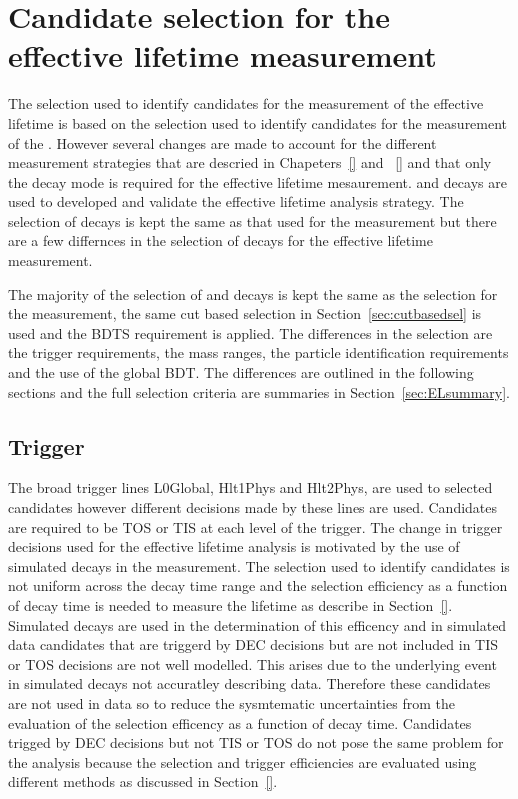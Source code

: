 \section{Candidate selection for the effective lifetime measurement}
\label{sec:ELsel}
The selection used to identify candidates for the measurement of the \bsmumu effective lifetime is based on the selection used to identify candidates for the measurement of the \bmumu \BFs. However several changes are made to account for the different measurement strategies that are descried in Chapeters~\ref{} and ~\ref{} and that only the \bs decay mode is required for the effective lifetime mesaurement. 
\bhh and \bsjpisphi decays are used to developed and validate the effective lifetime analysis strategy. The selection of \bsjpsiphi decays is kept the same as that used for the \BF measurement but there are a few differnces in the selection of \bhh decays for the effective lifetime measurement.

The majority of the selection of \bsmumu and \bhh decays is kept the same as the selection for the \BF measurement, the same cut based selection in Section~\ref{sec:cutbasedsel} is used and the BDTS requirement is applied.   
The differences in the selection are the trigger requirements, the mass ranges, the particle identification requirements and the use of the global BDT. The differences are outlined in the following sections and the full selection criteria are summaries in Section~\ref{sec:ELsummary}.


\subsection{Trigger}
\label{sec:ELtrigger}

The broad trigger lines L0Global, Hlt1Phys and Hlt2Phys, are used to selected \bsmumu candidates however different decisions made by these lines are used. Candidates are required to be TOS or TIS at each level of the trigger. The change in trigger decisions used for the effective lifetime analysis is motivated by the use of simulated decays in the measurement. The selection used to identify candidates is not uniform across the decay time range and the selection efficiency as a function of decay time is needed to measure the lifetime as describe in Section~\ref{}. Simulated \bsmumu decays are used in the determination of this efficency and in simulated data candidates that are triggerd by DEC decisions but are not included in TIS or TOS decisions are not well modelled. This arises due to the underlying event in simulated decays not accuratley describing data. Therefore these candidates are not used in data so to reduce the sysmtematic uncertainties from the evaluation of the selection efficency as a function of decay time. 
Candidates trigged by DEC decisions but not TIS or TOS do not pose the same problem for the \BF analysis because the selection and trigger efficiencies are evaluated using different methods as discussed in Section~\ref{}.

